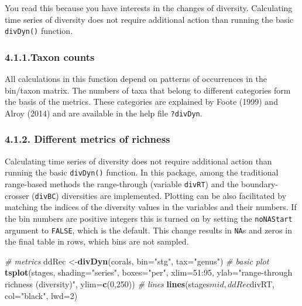 \documentclass[]{article}
\newenvironment{Shaded}{\begin{snugshade}}{\end{snugshade}}
\newcommand{\KeywordTok}[1]{\textcolor[rgb]{0.13,0.29,0.53}{\textbf{{#1}}}}
\newcommand{\DataTypeTok}[1]{\textcolor[rgb]{0.13,0.29,0.53}{{#1}}}
\newcommand{\DecValTok}[1]{\textcolor[rgb]{0.00,0.00,0.81}{{#1}}}
\newcommand{\StringTok}[1]{\textcolor[rgb]{0.31,0.60,0.02}{{#1}}}
\newcommand{\CommentTok}[1]{\textcolor[rgb]{0.56,0.35,0.01}{\textit{{#1}}}}
\newcommand{\NormalTok}[1]{{#1}}
\begin{document}
You read this because you have interests in the changes of diversity.
Calculating time series of diversity does not require additional action
than running the basic \texttt{divDyn()} function.

\subsubsection{4.1.1.Taxon counts}\label{taxon-counts}

All calculations in this function depend on patterns of occurrences in
the bin/taxon matrix. The numbers of taxa that belong to different
categories form the basis of the metrics. These categories are explained
by Foote (1999) and Alroy (2014) and are available in the help file
\texttt{?divDyn}.

\subsubsection{4.1.2. Different metrics of
richness}\label{different-metrics-of-richness}

Calculating time series of diversity does not require additional action
than running the basic \texttt{divDyn()} function. In this package,
among the traditional range-based methods the range-through (variable
\texttt{divRT}) and the boundary-crosser (\texttt{divBC}) diversities
are implemented. Plotting can be also facilitated by matching the
indices of the diversity values in the variables and their numbers. If
the bin numbers are positive integers this is turned on by setting the
\texttt{noNAStart} argument to \texttt{FALSE}, which is the default.
This change results in \texttt{NA}s and zeros in the final table in
rows, which bins are not sampled.

\begin{Shaded}
\begin{Highlighting}[]
\CommentTok{# metrics}
\NormalTok{ddRec <-}\KeywordTok{divDyn}\NormalTok{(corals, }\DataTypeTok{bin=}\StringTok{"stg"}\NormalTok{, }\DataTypeTok{tax=}\StringTok{"genus"}\NormalTok{)}
\CommentTok{# basic plot}
  \KeywordTok{tsplot}\NormalTok{(stages, }\DataTypeTok{shading=}\StringTok{"series"}\NormalTok{, }\DataTypeTok{boxes=}\StringTok{"per"}\NormalTok{, }\DataTypeTok{xlim=}\DecValTok{51}\NormalTok{:}\DecValTok{95}\NormalTok{,}
    \DataTypeTok{ylab=}\StringTok{"range-through richness (diversity)"}\NormalTok{, }\DataTypeTok{ylim=}\KeywordTok{c}\NormalTok{(}\DecValTok{0}\NormalTok{,}\DecValTok{250}\NormalTok{))}
\CommentTok{# lines}
  \KeywordTok{lines}\NormalTok{(stages$mid, ddRec$divRT, }\DataTypeTok{col=}\StringTok{"black"}\NormalTok{, }\DataTypeTok{lwd=}\DecValTok{2}\NormalTok{)}
\end{Highlighting}
\end{Shaded}
\end{document}
